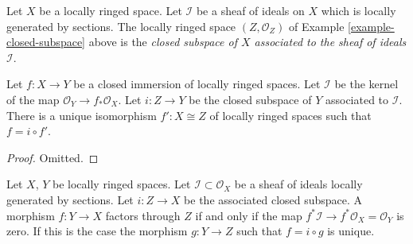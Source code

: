\begin{definition}
\label{definition-closed-subspace}
Let $X$ be a locally ringed space.
Let $\mathcal{I}$ be a sheaf of ideals on $X$
which is locally generated by sections.
The locally ringed space $(Z, \mathcal{O}_Z)$
of Example \ref{example-closed-subspace} above
is the {\it closed subspace of $X$ associated to
the sheaf of ideals $\mathcal{I}$}.
\end{definition}

\begin{lemma}
\label{lemma-closed-immersion}
Let $f : X \to Y$ be a closed immersion of
locally ringed spaces. Let $\mathcal{I}$ be the
kernel of the map $\mathcal{O}_Y \to f_*\mathcal{O}_X$.
Let $i : Z \to Y$ be the closed subspace of $Y$
associated to $\mathcal{I}$.
There is a unique isomorphism $f' : X \cong Z$ of
locally ringed spaces such that $f = i \circ f'$.
\end{lemma}

\begin{proof}
Omitted.
\end{proof}

\begin{lemma}
\label{lemma-characterize-closed-subspace}
Let $X$, $Y$ be locally ringed spaces. Let
$\mathcal{I} \subset \mathcal{O}_X$ be a sheaf of ideals locally generated
by sections. Let $i : Z \to X$ be the associated closed subspace.
A morphism $f : Y \to X$ factors through $Z$ if and only if the map
$f^*\mathcal{I} \to f^*\mathcal{O}_X = \mathcal{O}_Y$
is zero. If this is the case the morphism $g : Y \to Z$
such that $f = i \circ g$ is unique.
\end{lemma}

